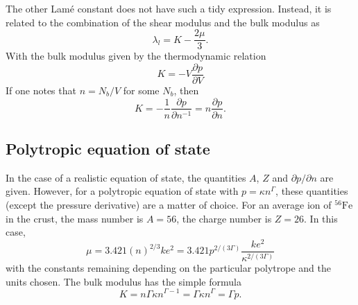 The other Lam\'e constant does not have such a tidy expression. Instead, it is related to the combination of the shear modulus and the bulk modulus as
\begin{equation}
\lambda_l = K - \frac{2\mu}{3}.
\label{eq:lameLambda}
\end{equation}
With the bulk modulus given by the thermodynamic relation
\begin{equation}
K = -V \frac{\partial p}{\partial V}
\label{eq:bulkModulusThermo}
\end{equation}
If one notes that $n=N_b/V$ for some $N_b$, then
\begin{equation}
K = -\frac{1}{n}\frac{\partial p}{\partial n^{-1}} = n\frac{\partial p}{\partial n}.
\label{eq:bulkModulus}
\end{equation}

\subsection{Polytropic equation of state}
In the case of a realistic equation of state, the quantities $A$, $Z$ and $\partial p/\partial n$ are given. However, for a polytropic equation of state with $p=\kappa n^\Gamma$, these quantities (except the pressure derivative) are a matter of choice. For an average ion of ${}^{56}\mathrm{Fe}$ in the crust, the mass number is $A=56$, the charge number is $Z=26$. In this case,
\begin{equation}
\mu = 3.421\left(n\right)^{2/3}ke^2 = 3.421p^{2/(3\Gamma)}\frac{ke^2}{\kappa^{2/(3\Gamma)}}
\label{eq:polytropicShear}
\end{equation}
with the constants remaining depending on the particular polytrope and the units chosen. The bulk modulus has the simple formula
\begin{equation}
K = n\Gamma \kappa n^{\Gamma-1} = \Gamma \kappa n^\Gamma = \Gamma p.
\label{eq:polytropicBulkModulus}
\end{equation}